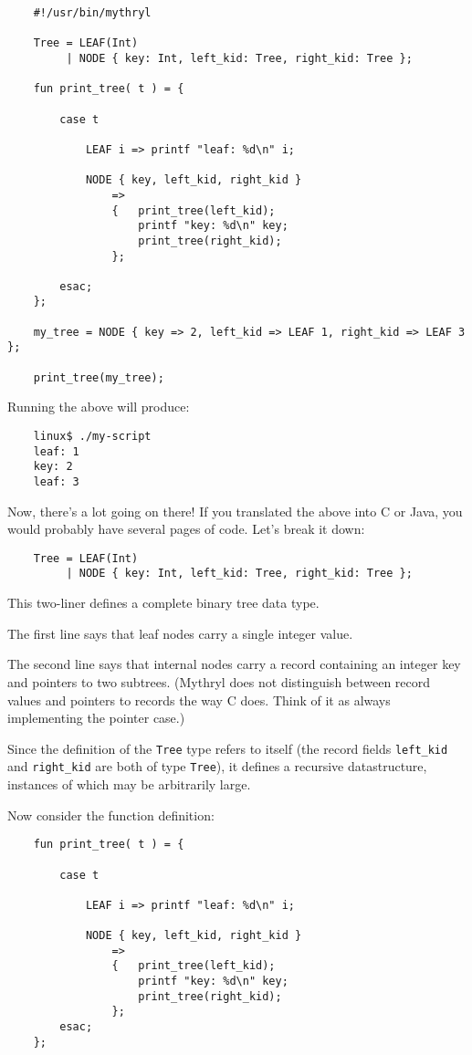\begin{verbatim}
    #!/usr/bin/mythryl

    Tree = LEAF(Int)
         | NODE { key: Int, left_kid: Tree, right_kid: Tree };

    fun print_tree( t ) = {

        case t

            LEAF i => printf "leaf: %d\n" i;

            NODE { key, left_kid, right_kid }
                =>
                {   print_tree(left_kid);
                    printf "key: %d\n" key;
                    print_tree(right_kid);
                };

        esac;
    };

    my_tree = NODE { key => 2, left_kid => LEAF 1, right_kid => LEAF 3 };

    print_tree(my_tree);
\end{verbatim}

Running the above will produce:

\begin{verbatim}
    linux$ ./my-script
    leaf: 1
    key: 2
    leaf: 3
\end{verbatim}

Now, there's a lot going on there!  If you translated the above into 
C or Java, you would probably have several pages of code.  Let's break 
it down:

\begin{verbatim}
    Tree = LEAF(Int)
         | NODE { key: Int, left_kid: Tree, right_kid: Tree };
\end{verbatim}

This two-liner defines a complete binary tree data type. 

The first line says that leaf nodes carry a single integer value. 

The second line says that internal nodes carry a record containing an integer 
key and pointers to two subtrees.  (Mythryl does not distinguish between 
record values and pointers to records the way C does.  Think of it as 
always implementing the pointer case.)

Since the definition of the {\tt Tree} type refers to itself (the 
record fields {\tt left\_kid} and {\tt right\_kid} are both of type 
{\tt Tree}), it defines a recursive datastructure, instances of which may be 
arbitrarily large.

Now consider the function definition:

\begin{verbatim}
    fun print_tree( t ) = {

        case t

            LEAF i => printf "leaf: %d\n" i;

            NODE { key, left_kid, right_kid }
                =>
                {   print_tree(left_kid);
                    printf "key: %d\n" key;
                    print_tree(right_kid);
                };
        esac;
    };
\end{verbatim}


